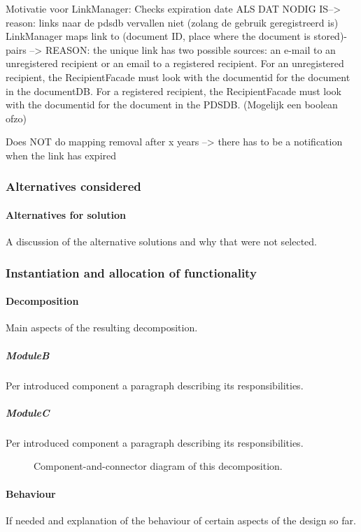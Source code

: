 \documentclass[a4paper,10pt]{article}
\begin{document}
Motivatie voor LinkManager: Checks expiration date ALS DAT NODIG IS--> reason: links naar de pdsdb vervallen niet (zolang de gebruik geregistreerd is)
LinkManager maps link to (document ID, place where the document is stored)-pairs --> REASON: the unique link has two possible sources: an e-mail to an unregistered recipient or an email to a registered recipient. For an unregistered recipient, the RecipientFacade must look with the documentid for the document in the documentDB. For a registered recipient, the RecipientFacade must look with the documentid for the document  in the PDSDB. (Mogelijk een boolean ofzo)

Does NOT do mapping removal after x years --> there has to be a notification when the link has expired

\subsubsection*{Alternatives considered}
\paragraph{Alternatives for solution}
A discussion of the alternative solutions and why that were not selected.

\subsubsection{Instantiation and allocation of functionality}
\paragraph{Decomposition}
Main aspects of the resulting decomposition.

\subparagraph{ModuleB}
Per introduced component a paragraph describing its responsibilities.

\subparagraph{ModuleC}
Per introduced component a paragraph describing its responsibilities.

\begin{figure}[!htp]
    \centering
    \caption{Component-and-connector diagram of this decomposition.
        }\label{fig:it1-cc_main}
\end{figure}

\paragraph{Behaviour}
If needed and explanation of the behaviour of certain aspects of the design so
far.
\end{document}
